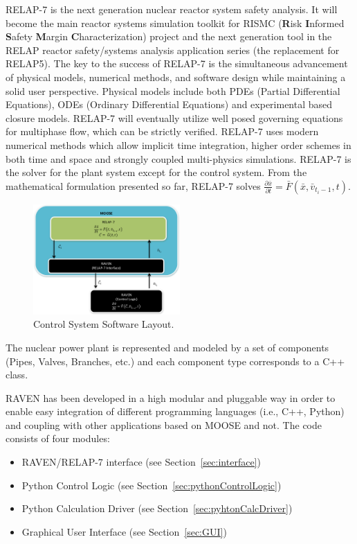 \documentclass{mc2013}
\begin{document}
RELAP-7 is the next generation nuclear reactor system safety analysis. It will become the main reactor systems simulation toolkit for RISMC (\textbf{R}isk \textbf{I}nformed \textbf{S}afety \textbf{M}argin \textbf{C}haracterization) project and the next generation tool in the RELAP reactor safety/systems analysis application series (the replacement for RELAP5). The key to the success of RELAP-7 is the simultaneous advancement of physical models, numerical methods, and software design while maintaining a solid user perspective. 
Physical models include both PDEs (Partial Differential Equations), ODEs (Ordinary Differential Equations) and experimental based closure models. RELAP-7 will eventually utilize well posed governing equations for multiphase flow, which can be strictly verified. RELAP-7 uses modern numerical methods which allow implicit time integration, higher order schemes in both time and space and strongly coupled multi-physics simulations.
RELAP-7 is the solver for the plant system except for the control system. From the mathematical
formulation presented so far, RELAP-7 solves 
$\frac{\partial \bar{x}}{\partial t} = \bar{F}(\bar{x},\bar{v}_{t_{i}-1},t)$.
\begin{figure}[h] 
  \centering
     \includegraphics[width=0.5\textwidth]{figures/ControlSystemSoftwareLayout.pdf}
  \caption{Control System Software Layout.}
   \label{fig:ControlSoftwareLayout}
\end{figure}
The nuclear power plant is represented and modeled by a set of components (Pipes, Valves, Branches, etc.) and each component type corresponds to a C++ class.

RAVEN has been developed in a high modular and pluggable way in order to enable easy integration of different programming languages (i.e., C++, Python) and coupling with other applications based on MOOSE and not. The code consists of four modules:
\begin{itemize}
\item RAVEN/RELAP-7 interface (see Section~\ref{sec:interface})
\item Python Control Logic (see Section~\ref{sec:pythonControlLogic})
\item Python Calculation Driver (see Section~\ref{sec:pyhtonCalcDriver})
\item Graphical User Interface (see Section~\ref{sec:GUI})
\end{itemize}
\end{document}
